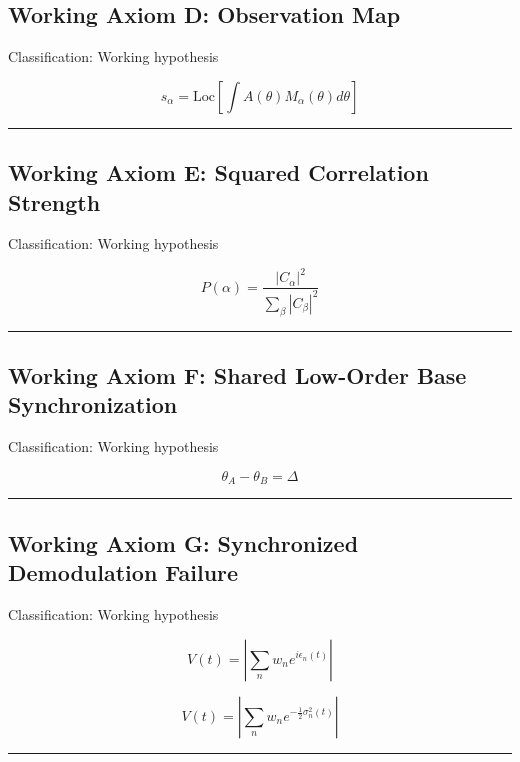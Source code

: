 \documentclass[
  a4paper,
]{article}
\begin{document}
\subsection{Working Axiom D: Observation
Map}\label{working-axiom-d-observation-map}

Classification: Working hypothesis

\[
s_\alpha=\mathrm{Loc}\left[\int A(\theta)M_\alpha(\theta)d\theta\right]
\]

\begin{center}\rule{0.5\linewidth}{0.5pt}\end{center}

\subsection{Working Axiom E: Squared Correlation
Strength}\label{working-axiom-e-squared-correlation-strength}

Classification: Working hypothesis

\[
P(\alpha)=\frac{|C_\alpha|^2}{\sum_\beta |C_\beta|^2}
\]

\begin{center}\rule{0.5\linewidth}{0.5pt}\end{center}

\subsection{Working Axiom F: Shared Low-Order Base
Synchronization}\label{working-axiom-f-shared-low-order-base-synchronization}

Classification: Working hypothesis

\[
\theta_A-\theta_B=\Delta
\]

\begin{center}\rule{0.5\linewidth}{0.5pt}\end{center}

\subsection{Working Axiom G: Synchronized Demodulation
Failure}\label{working-axiom-g-synchronized-demodulation-failure}

Classification: Working hypothesis

\[
V(t)=\left|\sum_n w_n e^{i\epsilon_n(t)}\right|
\]

\[
V(t)=\left|\sum_n w_n e^{-\frac12\sigma_n^2(t)}\right|
\]

\begin{center}\rule{0.5\linewidth}{0.5pt}\end{center}
\end{document}
